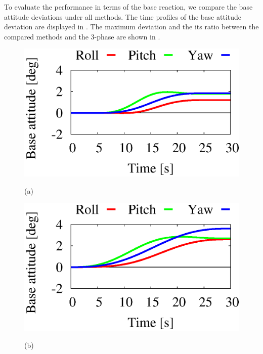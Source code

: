 To evaluate the performance in terms of the base reaction,
we compare the base attitude deviations under all methods.
The time profiles of the base attitude deviation are displayed in .
The maximum deviation and the its ratio between the compared methods and the 3-phase are shown in .
%
\begin{figure}[t]
  \centering
  \begin{minipage}[h]{0.4\linewidth}
    \centering
    \includegraphics[width=1.0\linewidth]{fig/chapter4/PTP/3phase/X02_Base_Orientation.eps}
    \footnotesize\par{(a)}
  \end{minipage}
  \begin{minipage}[h]{0.4\linewidth}
    \centering
    \includegraphics[width=1.0\linewidth]{fig/chapter4/PTP/JS-C/X02_Base_Orientation.eps}
    \footnotesize\par{(b)}
  \end{minipage}
  \begin{minipage}[h]{0.4\linewidth}

\end{minipage}
\end{figure}
